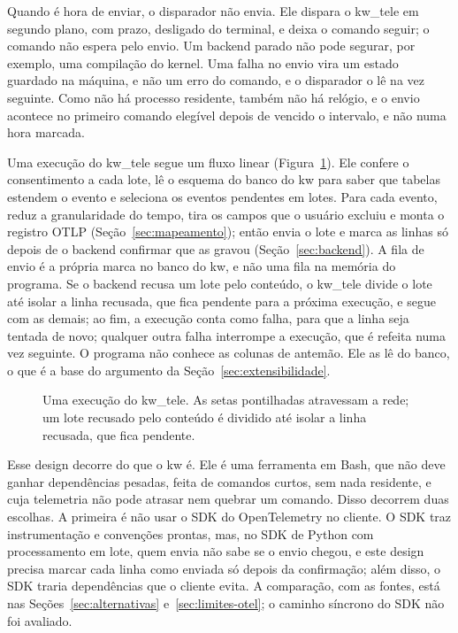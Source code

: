 Quando é hora de enviar, o disparador não envia. Ele dispara o kw\_tele em
segundo plano, com prazo, desligado do terminal, e deixa o comando seguir; o
comando não espera pelo envio. Um backend parado não pode segurar, por
exemplo, uma compilação do kernel. Uma falha no envio vira um estado guardado
na máquina, e não um erro do comando, e o disparador o lê na vez seguinte.
Como não há processo residente, também não há relógio, e o envio acontece no
primeiro comando elegível depois de vencido o intervalo, e não numa hora
marcada.

Uma execução do kw\_tele segue um fluxo linear
(Figura~\ref{fig:kwtele-execucao}). Ele confere o consentimento a cada lote,
lê o esquema do banco do kw para saber que tabelas estendem o evento e
seleciona os eventos pendentes em lotes. Para cada evento, reduz a
granularidade do tempo, tira os campos que o usuário excluiu e monta o
registro OTLP (Seção~\ref{sec:mapeamento}); então envia o lote e marca as
linhas só depois de o backend confirmar que as gravou
(Seção~\ref{sec:backend}). A fila de envio é a própria marca no banco do kw, e
não uma fila na memória do programa. Se o backend recusa um lote pelo
conteúdo, o kw\_tele divide o lote até isolar a linha recusada, que fica
pendente para a próxima execução, e segue com as demais; ao fim, a execução
conta como falha, para que a linha seja tentada de novo; qualquer outra falha
interrompe a execução, que é refeita numa vez seguinte. O programa não conhece
as colunas de antemão. Ele as lê do banco, o que é a base do argumento da
Seção~\ref{sec:extensibilidade}.

\begin{figure}[!ht]
  \centering
  \resizebox{\textwidth}{!}{}
  \caption{Uma execução do kw\_tele. As setas pontilhadas atravessam a rede; um
    lote recusado pelo conteúdo é dividido até isolar a linha recusada, que fica
    pendente.}
  \label{fig:kwtele-execucao}
\end{figure}

Esse design decorre do que o kw é. Ele é uma ferramenta em Bash, que não deve ganhar
dependências pesadas, feita de comandos curtos, sem nada residente, e cuja
telemetria não pode atrasar nem quebrar um comando. Disso decorrem duas
escolhas. A primeira é não usar o SDK do OpenTelemetry no cliente. O SDK traz
instrumentação e convenções prontas, mas, no SDK de Python com processamento
em lote, quem envia não sabe se o envio chegou, e este design precisa marcar
cada linha como enviada só depois da confirmação; além disso, o SDK traria
dependências que o cliente evita. A comparação, com as fontes, está nas
Seções~\ref{sec:alternativas} e~\ref{sec:limites-otel}; o caminho síncrono do
SDK não foi avaliado.

